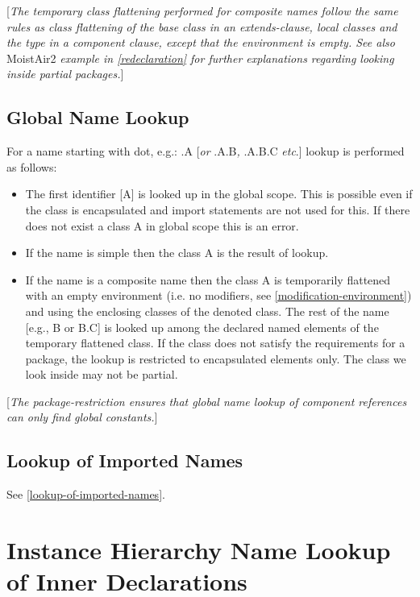 \documentclass[10pt,a4paper]{report}
\def\doublelabel#1{\label{#1}\hypertarget{#1}{}}
\begin{document}
{[}\emph{The temporary class flattening performed for composite names
follow the same rules as class flattening of the base class in an
extends-clause, local classes and the type in a component clause, except
that the environment is empty. See also} MoistAir2 \emph{example in
\ref{redeclaration} for further explanations regarding looking inside
partial packages.}{]}

\subsection{Global Name Lookup}\doublelabel{global-name-lookup}

For a name starting with dot, e.g.: .A {[}\emph{or} .A.B\emph{,} .A.B.C
\emph{etc}.{]} lookup is performed as follows:

\begin{itemize}
\item
  The first identifier [A] is looked up in the global scope. This is
  possible even if the class is encapsulated and import statements are
  not used for this. If there does not exist a class A in global scope
  this is an error.
\item
  If the name is simple then the class A is the result of lookup.
\item
  If the name is a composite name then the class A is temporarily
  flattened with an empty environment (i.e. no modifiers, see 
  \ref{modification-environment}) and using the enclosing classes of the denoted class. The rest
  of the name [e.g., B or B.C] is looked up among the declared named
  elements of the temporary flattened class. If the class does not
  satisfy the requirements for a package, the lookup is restricted to
  encapsulated elements only. The class we look inside may not be
  partial.
\end{itemize}

{[}\emph{The package-restriction ensures that global name lookup of
component references can only find global constants.}{]}

\subsection{Lookup of Imported Names}\doublelabel{lookup-of-imported-names1}

See \ref{lookup-of-imported-names}.

\section{Instance Hierarchy Name Lookup of Inner Declarations}\doublelabel{instance-hierarchy-name-lookup-of-inner-declarations}
\end{document}
